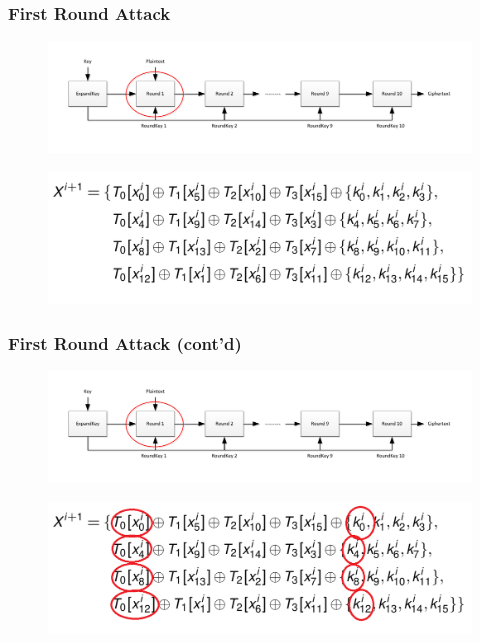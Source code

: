 \documentclass[9pt,handout]{beamer}
\begin{document}
\begin{frame}
	\frametitle{First Round Attack}
\vspace{-4em}
\begin{figure}[h!]
	\centering
	\includegraphics[scale=0.5]{images/aesAttack_first.pdf} 
\end{figure}
\begin{figure}
\centering
\includegraphics[scale = 0.3]{images/first.png}
\end{figure}	
	
\end{frame}

\begin{frame}
	\frametitle{First Round Attack (cont'd)}
\vspace{-4em}
\begin{figure}[h!]
	\centering
	\includegraphics[scale=0.5]{images/aesAttack_first.pdf} 
\end{figure}
\begin{figure}
\centering
\includegraphics[scale = 0.3]{images/firstCircled.png}
\end{figure}	
\end{frame}
\end{document}
